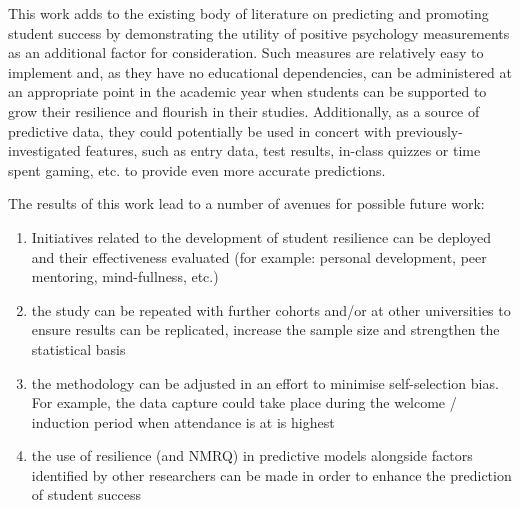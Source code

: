 \documentclass[sigconf]{acmart}
\begin{document}
This work adds to the existing body of literature on predicting and promoting student success by demonstrating the utility of positive psychology measurements as an additional factor for consideration. Such measures are relatively easy to implement and, as they have no educational dependencies, can be administered at an appropriate point in the academic year when students can be supported to grow their resilience and flourish in their studies. Additionally, as a source of predictive data, they could potentially be used in concert with previously-investigated features, such as entry data, test results,  in-class quizzes or time spent gaming, etc. to provide even more accurate predictions. 

The results of this work lead to a number of avenues for possible future work:

\begin{enumerate}
\item Initiatives related to the development of student resilience can be deployed and their effectiveness evaluated (for example: personal development, peer mentoring, mind-fullness, etc.)
\item the study can be repeated with further cohorts and/or at other universities to ensure results can be replicated, increase the sample size and strengthen the statistical basis
\item the methodology can be adjusted in an effort to minimise self-selection bias. For example, the data capture could take place during the welcome / induction period when attendance is at is highest
\item the use of resilience (and NMRQ) in predictive models alongside factors identified by other researchers can be made in order to enhance the prediction of student success


\end{enumerate}

\newpage
\balance



\appendix
\end{document}
